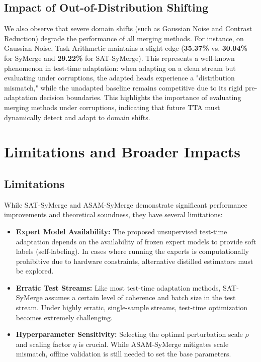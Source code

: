 \documentclass{article}
\begin{document}
\subsection{Impact of Out-of-Distribution Shifting}
We also observe that severe domain shifts (such as Gaussian Noise and Contrast Reduction) degrade the performance of all merging methods. For instance, on Gaussian Noise, Task Arithmetic maintains a slight edge (\textbf{35.37\%} vs. \textbf{30.04\%} for SyMerge and \textbf{29.22\%} for SAT-SyMerge). This represents a well-known phenomenon in test-time adaptation: when adapting on a clean stream but evaluating under corruptions, the adapted heads experience a "distribution mismatch," while the unadapted baseline remains competitive due to its rigid pre-adaptation decision boundaries. This highlights the importance of evaluating merging methods under corruptions, indicating that future TTA must dynamically detect and adapt to domain shifts.

\section{Limitations and Broader Impacts}
\label{sec:limitations}

\subsection{Limitations}
While SAT-SyMerge and ASAM-SyMerge demonstrate significant performance improvements and theoretical soundness, they have several limitations:
\begin{itemize}
    \item \textbf{Expert Model Availability:} The proposed unsupervised test-time adaptation depends on the availability of frozen expert models to provide soft labels (self-labeling). In cases where running the experts is computationally prohibitive due to hardware constraints, alternative distilled estimators must be explored.
    \item \textbf{Erratic Test Streams:} Like most test-time adaptation methods, SAT-SyMerge assumes a certain level of coherence and batch size in the test stream. Under highly erratic, single-sample streams, test-time optimization becomes extremely challenging.
    \item \textbf{Hyperparameter Sensitivity:} Selecting the optimal perturbation scale $\rho$ and scaling factor $\eta$ is crucial. While ASAM-SyMerge mitigates scale mismatch, offline validation is still needed to set the base parameters.
\end{itemize}
\end{document}
